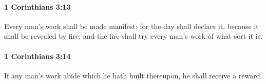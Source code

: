 		\paragraph{1 Corinthians 3:13} %
			\label{1CORINTHIANS-3-13}

			Every man's work shall be made manifest: for the day shall declare it, because it shall be revealed by fire; and the fire shall try every man's work of what sort it is.

			\begin{framed}
			\scriptsize
				\begin{compactdesc}
					\item[SBLG] 
				\end{compactdesc}
			\end{framed}

		\paragraph{1 Corinthians 3:14} %
			\label{1CORINTHIANS-3-14}

			If any man's work abide which he hath built thereupon, he shall receive a reward.

